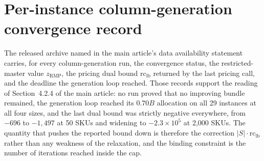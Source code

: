 \documentclass[11pt]{article}
\begin{document}
\section{Per-instance column-generation convergence record}\label{sup:cgrecord}
The released archive named in the main article's data availability statement carries, for every
column-generation run, the convergence status, the restricted-master value $z_{\mathrm{RMP}}$, the
pricing dual bound $\mathrm{rc}_{\mathrm{lb}}$ returned by the last pricing call, and the deadline
the generation loop reached. Those records support the reading of Section~4.2.4 of the main
article: no run proved that no improving bundle remained, the generation loop reached its $0.70B$
allocation on all 29 instances at all four sizes, and the last dual bound was strictly negative
everywhere, from $-696$ to $-1{,}497$ at 50 SKUs and widening to $-2.3\times10^{5}$ at 2,000 SKUs.
The quantity that pushes the reported bound down is therefore the correction
$|S|\cdot\mathrm{rc}_{\mathrm{lb}}$ rather than any weakness of the relaxation, and the binding
constraint is the number of iterations reached inside the cap.



\end{document}
